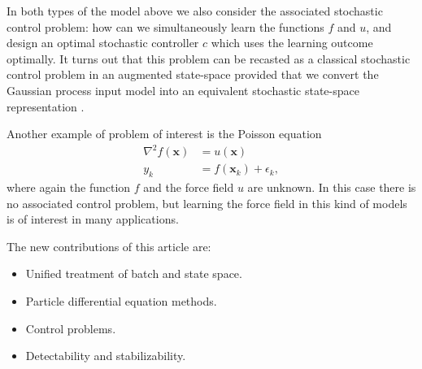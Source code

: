 \documentclass[journal]{IEEEtran}
\newcommand{\simo}[1]{{\color{red}#1}}
\begin{document}
In both types of the model above we also consider the associated stochastic control problem: how can we simultaneously learn the functions $f$ and $u$, and design an optimal stochastic controller $c$ which uses the learning outcome optimally. It turns out that this problem can be recasted as a classical stochastic control problem in an augmented state-space provided that we convert the Gaussian process input model into an equivalent stochastic state-space representation \cite{Hartikainen+Sarkka:2011,Hartikainen+Seppanen+Sarkka:2012}.

Another example of problem of interest is the Poisson equation
%
\begin{equation}
\begin{split}
  \nabla^2 f(\mathbf{x}) &= u(\mathbf{x}) \\
  y_k &= f(\mathbf{x}_k) + \epsilon_k,
\end{split}
\label{eq:sde0}
\end{equation}
%
where again the function $f$ and the force field $u$ are unknown. In this case there is no associated control problem, but learning the force field in this kind of models is of interest in many applications.



The new contributions of this article are:
%
\begin{itemize}
\item \simo{Unified treatment of batch and state space.}
\item \simo{Particle differential equation methods.}
\item \simo{Control problems.}
\item \simo{Detectability and stabilizability.}
\end{itemize}
\end{document}
